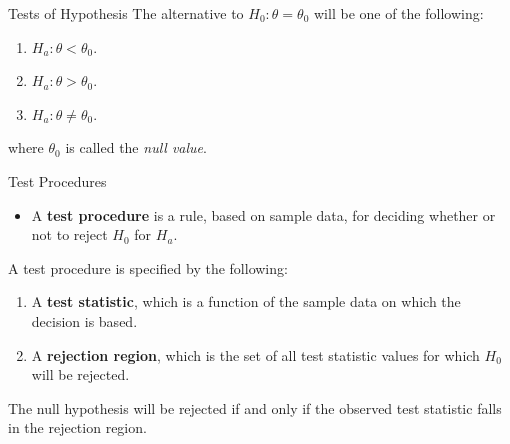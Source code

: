 \documentclass[
  ignorenonframetext,
]{beamer}
\providecommand{\tightlist}{%
  \setlength{\itemsep}{0pt}\setlength{\parskip}{0pt}}\usepackage{longtable,booktabs,array}
\begin{document}
\begin{frame}{Tests of Hypothesis}
\protect\hypertarget{tests-of-hypothesis}{}
The alternative to \(H_{0}: \theta = \theta_{0}\) will be one of the
following:

\begin{enumerate}[<+->]
\tightlist
\item
  \(H_{a}: \theta < \theta_{0}\).
\item
  \(H_{a}: \theta > \theta_{0}\).
\item
  \(H_{a}: \theta \neq \theta_{0}\).
\end{enumerate}

where \(\theta_{0}\) is called the \emph{null value}.
\end{frame}

\begin{frame}{Test Procedures}
\protect\hypertarget{test-procedures}{}
\begin{itemize}[<+->]
\tightlist
\item
  A \textbf{test procedure} is a rule, based on sample data, for
  deciding whether or not to reject \(H_{0}\) for \(H_{a}\).
\end{itemize}

\begin{tcolorbox}[enhanced jigsaw, left=2mm, breakable, bottomrule=.15mm, colframe=quarto-callout-important-color-frame, arc=.35mm, leftrule=.75mm, colbacktitle=quarto-callout-important-color!10!white, titlerule=0mm, opacityback=0, coltitle=black, opacitybacktitle=0.6, colback=white, toprule=.15mm, toptitle=1mm, bottomtitle=1mm, title=\textcolor{quarto-callout-important-color}{\faExclamation}\hspace{0.5em}{Test Procedure}, rightrule=.15mm]

A test procedure is specified by the following:

\begin{enumerate}[<+->]
\tightlist
\item
  A \textbf{test statistic}, which is a function of the sample data on
  which the decision is based.
\item
  A \textbf{rejection region}, which is the set of all test statistic
  values for which \(H_{0}\) will be rejected.
\end{enumerate}

The null hypothesis will be rejected if and only if the observed test
statistic falls in the rejection region.

\end{tcolorbox}
\end{frame}
\end{document}
